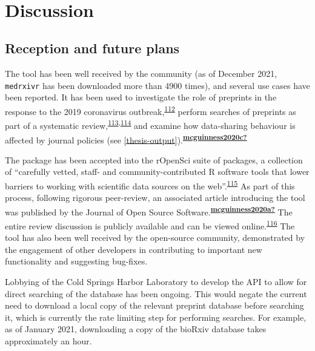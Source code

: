 \documentclass[a4paper, twoside]{templates/ociamthesis}
\begin{document}
~

\hypertarget{discussion}{%
\section{Discussion}\label{discussion}}

\hypertarget{reception-and-future-plans}{%
\subsection{Reception and future plans}\label{reception-and-future-plans}}

The tool has been well received by the community (as of December 2021, \texttt{medrxivr} has been downloaded more than 4900 times), and several use cases have been reported. It has been used to investigate the role of preprints in the response to the 2019 coronavirus outbreak,\textsuperscript{\protect\hyperlink{ref-kodvanj2020}{112}} perform searches of preprints as part of a systematic review,\textsuperscript{\protect\hyperlink{ref-noone2020}{113},\protect\hyperlink{ref-grassly2020}{114}} and examine how data-sharing behaviour is affected by journal policies (see \ref{thesis-output}).\textsuperscript{\protect\hyperlink{ref-mcguinness2020c}{\textbf{mcguinness2020c?}}}

The package has been accepted into the rOpenSci suite of packages, a collection of ``carefully vetted, staff- and community-contributed R software tools that lower barriers to working with scientific data sources on the web''.\textsuperscript{\protect\hyperlink{ref-boettiger2015}{115}} As part of this process, following rigorous peer-review, an associated article introducing the tool was published by the Journal of Open Source Software.\textsuperscript{\protect\hyperlink{ref-mcguinness2020a}{\textbf{mcguinness2020a?}}} The entire review discussion is publicly available and can be viewed online.\textsuperscript{\protect\hyperlink{ref-zotero-15016}{116}} The tool has also been well received by the open-source community, demonstrated by the engagement of other developers in contributing to important new functionality and suggesting bug-fixes.

Lobbying of the Cold Springs Harbor Laboratory to develop the API to allow for direct searching of the database has been ongoing. This would negate the current need to download a local copy of the relevant preprint database before searching it, which is currently the rate limiting step for performing searches. For example, as of January 2021, downloading a copy of the bioRxiv database takes approximately an hour.
\end{document}
